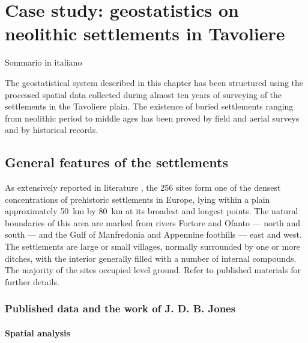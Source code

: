 \chapter{Case study: geostatistics on neolithic settlements in Tavoliere}

    \begin{chaptersum}
        Sommario in italiano
    \end{chaptersum}

    The geostatistical system described in this chapter has been structured using the processed spatial data collected during almost ten years of surveying of the settlements in the Tavoliere plain. The existence of buried settlements ranging from neolithic period to middle ages has been proved by field and aerial surveys and by historical records.

    \section{General features of the settlements}
        As extensively reported in literature \cite{intro-tavoliere}, the 256 sites form one of the densest concentrations of prehistoric settlements in Europe, lying within a plain approximately \SI{50}{\kilo\meter} by \SI{80}{\kilo\meter} at its broadest and longest points. The natural boundaries of this area are marked from rivers Fortore and Ofanto --- north and south --- and the Gulf of Manfredonia and Appennine foothills --- east and west.\\
        The settlements are large or small villages, normally surrounded by one or more ditches, with the interior generally filled with a number of internal compounds. The majority of the sites occupied level ground. Refer to published materials for further details.

        \subsection{Published data and the work of J. D. B. Jones\label{sec:jones}}

            \subsubsection{Spatial analysis}

